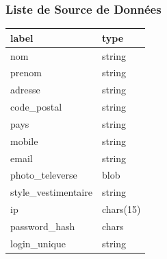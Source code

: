 \documentclass[9pt]{beamer}
\begin{document}
\begin{frame}
\frametitle{Liste de Source de Données}
\center
\begin{tabular}{ll}
\toprule
               label &       type \\
\midrule
                  nom &     string \\
            prenom &     string \\
             adresse &     string \\
        code\_postal &     string \\
              pays &     string \\
           mobile &     string \\
              email &     string \\
      photo\_televerse &       blob \\
  style\_vestimentaire &     string \\
                   ip &  chars(15) \\
        password\_hash &      chars \\
         login\_unique &     string \\
\bottomrule
\end{tabular}
\end{frame}
\end{document}
